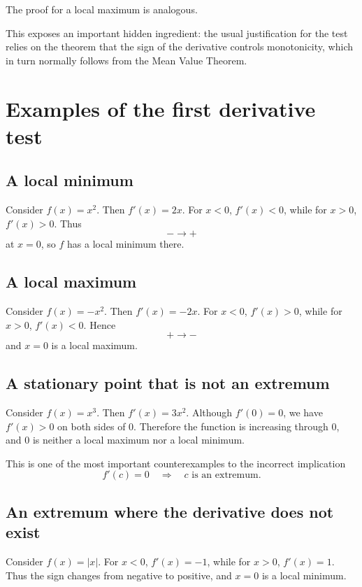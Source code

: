 \documentclass{essay}
\begin{document}
The proof for a local maximum is analogous.

This exposes an important hidden ingredient: the usual justification for the test relies on the theorem that the sign of the derivative controls monotonicity, which in turn normally follows from the Mean Value Theorem.

\section{Examples of the first derivative test}

\subsection{A local minimum}

Consider \(f(x)=x^{2}\). Then \(f'(x)=2x\). For \(x<0\), \(f'(x)<0\), while for \(x>0\), \(f'(x)>0\).
Thus
\[ -\longrightarrow + \]
at \(x=0\), so \(f\) has a local minimum there.

\subsection{A local maximum}

Consider \(f(x)=-x^{2}\). Then \(f'(x)=-2x\).
For \(x<0\), \(f'(x)>0\), while for \(x>0\), \(f'(x)<0\). Hence
\[ +\longrightarrow - \]
and \(x=0\) is a local maximum.

\subsection{A stationary point that is not an extremum}

Consider \(f(x)=x^{3}\). Then \(f'(x)=3x^{2}\). Although \(f'(0)=0\), we have \(f'(x)>0\) on both sides of \(0\). Therefore the function is increasing through \(0\), and \(0\) is neither a local maximum nor a local minimum.

This is one of the most important counterexamples to the incorrect implication
\[
  f'(c)=0
  \quad\Longrightarrow\quad
  \text{\(c\) is an extremum}.
\]

\subsection{An extremum where the derivative does not exist}

Consider \(f(x)=|x|\). For \(x<0\), \(f'(x)=-1\), while for \(x>0\), \(f'(x)=1\).
Thus the sign changes from negative to positive, and \(x=0\) is a local minimum.
\end{document}
